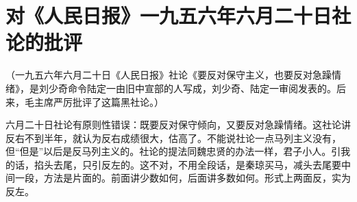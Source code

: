 \section[对《人民日报》一九五六年六月二十日社论的批评 ]{对《人民日报》一九五六年六月二十日社论的批评 }


（一九五六年六月二十日《人民日报》社论《要反对保守主义，也要反对急躁情绪》，是刘少奇命令陆定一由旧中宣部的人写成，刘少奇、陆定一审阅发表的。后来，毛主席严厉批评了这篇黑社论。）

六月二十日社论有原则性错误：既要反对保守倾向，又要反对急躁情绪。这社论讲反右不到半年，就认为反右成绩很大，估高了。不能说社论一点马列主义没有，但“但是”以后是反马列主义的。社论的提法同魏忠贤的办法一样，君子小人。引我的话，掐头去尾，只引反左的。这不对，不用全段话，是秦琼买马，减头去尾要中间一段，方法是片面的。前面讲少数如何，后面讲多数如何。形式上两面反，实为反左。


